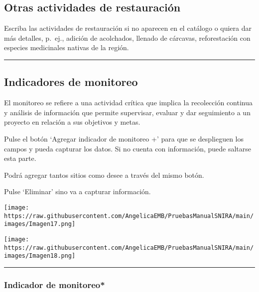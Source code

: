 \documentclass[
]{book}
\begin{document}
\hypertarget{otras-actividades-de-restauraciuxf3n}{%
\subsection*{Otras actividades de restauración}\label{otras-actividades-de-restauraciuxf3n}}

Escriba las actividades de restauración si no aparecen en el catálogo o quiera dar más detalles, p.~ej., adición de acolchados, llenado de cárcavas, reforestación con especies medicinales nativas de la región.

\begin{center}\rule{0.5\linewidth}{0.5pt}\end{center}

\hypertarget{indicadores-de-monitoreo}{%
\subsection*{Indicadores de monitoreo}\label{indicadores-de-monitoreo}}

El monitoreo se refiere a una actividad crítica que implica la recolección continua y análisis de información que permite supervisar, evaluar y dar seguimiento a un proyecto en relación a sus objetivos y metas.

Pulse el botón `Agregar indicador de monitoreo +' para que se desplieguen los campos y pueda capturar los datos. Si no cuenta con información, puede saltarse esta parte.

Podrá agregar tantos sitios como desee a través del mismo botón.

Pulse `Eliminar' sino va a capturar información.

\texttt{[image: https://raw.githubusercontent.com/AngelicaEMB/PruebasManualSNIRA/main/images/Imagen17.png]}

\texttt{[image: https://raw.githubusercontent.com/AngelicaEMB/PruebasManualSNIRA/main/images/Imagen18.png]}

\begin{center}\rule{0.5\linewidth}{0.5pt}\end{center}

\hypertarget{indicador-de-monitoreo}{%
\subsubsection*{\texorpdfstring{{Indicador de monitoreo*}}{Indicador de monitoreo*}}\label{indicador-de-monitoreo}}
\end{document}
